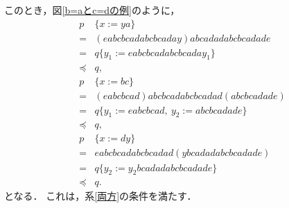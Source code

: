 このとき，図\ref{b=aとc=dの例}のように，
\begin{eqnarray*}
&p& \{ x:=ya \} \\ 
& = & (eabcbcadabcbcaday)abcadadabcbcadade\\
& = & q \{ y_{1} := eabcbcadabcbcaday_{1} \} \\
& \preceq & q,\\
&p& \{ x:=bc \}  \\
& = & (eabcbcad)abcbcadabcbcadad(abcbcadade) \\
& = & q \{ y_{1} := eabcbcad,~y_{2} := abcbcadade \} \\
& \preceq & q,\\
&p& \{ x:=dy \}  \\
& = & eabcbcadabcbcadad(ybcadadabcbcadade) \\
& = & q \{ y_{2} := y_{2}bcadadabcbcadade \} \\
& \preceq & q.
\end{eqnarray*}
となる．
これは，系\ref{両方}の条件を満たす．

